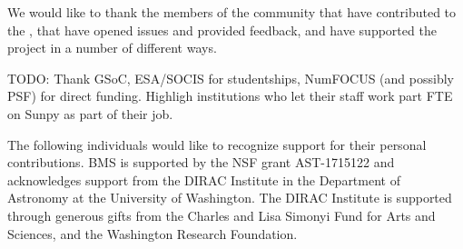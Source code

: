\acknowledgments

We would like to thank the members of the community that have
contributed to the \sunpyproj, that have opened issues and provided feedback, and
have supported the project in a number of different ways.

TODO: Thank GSoC, ESA/SOCIS for studentships, NumFOCUS (and possibly
PSF) for direct funding. Highligh institutions who let their staff work part
FTE on Sunpy as part of their job.

The following individuals would like to recognize support for their personal
contributions. BMS is supported by the NSF grant AST-1715122 and
acknowledges support from the DIRAC Institute in the Department of Astronomy
at the University of Washington. The DIRAC Institute is supported through
generous gifts from the Charles and Lisa Simonyi Fund for Arts and Sciences,
and the Washington Research Foundation.

